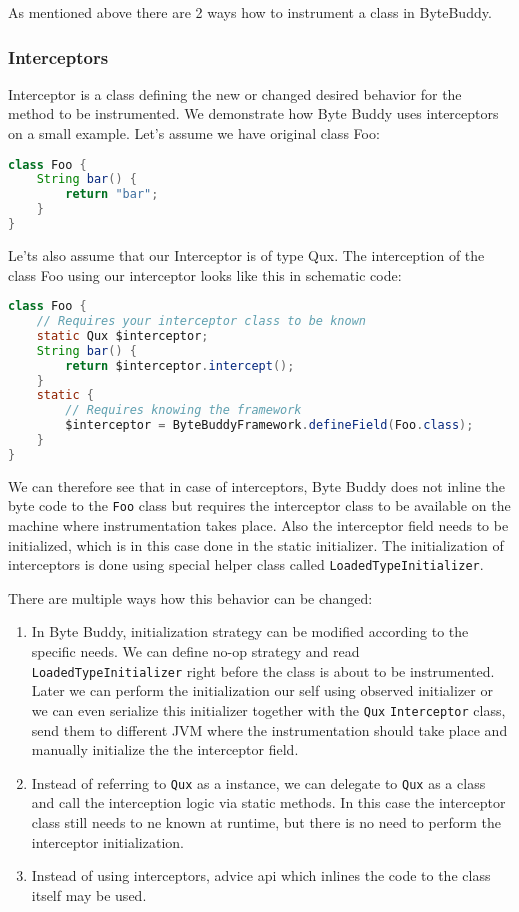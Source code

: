 As mentioned above there are 2 ways how to instrument a class in ByteBuddy.
\subsubsection{Interceptors}
Interceptor is a class defining the new or changed desired behavior for the method to be instrumented. 
We demonstrate how Byte Buddy uses interceptors on a small example. Let's assume we have original class Foo:
\begin{lstlisting}[language=Java]
class Foo {
	String bar() {
		return "bar"; 
	}
}
\end{lstlisting}
	
Le'ts also assume that our Interceptor is of type Qux. The interception of the class Foo using our interceptor looks like this in schematic code:

\begin{lstlisting}[language=Java]
class Foo {
	// Requires your interceptor class to be known
	static Qux $interceptor;
	String bar() {
		return $interceptor.intercept(); 
	}
	static {
		// Requires knowing the framework
		$interceptor = ByteBuddyFramework.defineField(Foo.class);
	}
}
\end{lstlisting}
		
We can therefore see that in case of interceptors, Byte Buddy does not inline the byte code to the \texttt{Foo} class but requires the interceptor class to be available on the machine where instrumentation takes place. Also the interceptor field needs to be initialized, which is in this case done in the static initializer. The initialization of interceptors is done using special helper class called \texttt{LoadedTypeInitializer}.

There are multiple ways how this behavior can be changed:
\begin{enumerate}
\item In Byte Buddy, initialization strategy can be modified according to the specific needs. We can define no-op strategy and read \texttt{LoadedTypeInitializer} right before the class is about to be instrumented.  Later we can perform the initialization our self using observed initializer or we can even serialize this initializer together with the \texttt{Qux} \texttt{Interceptor} class, send them to different JVM where the instrumentation should take place and manually initialize the the interceptor field.
\item Instead of referring to \texttt{Qux} as a instance, we can delegate to \texttt{Qux} as a class and call the interception logic via static methods. In this case the interceptor class still needs to ne known at runtime, but there is no need to perform the interceptor initialization.
\item Instead of using interceptors, advice api which inlines the code to the class itself may be used.
\end{enumerate}
